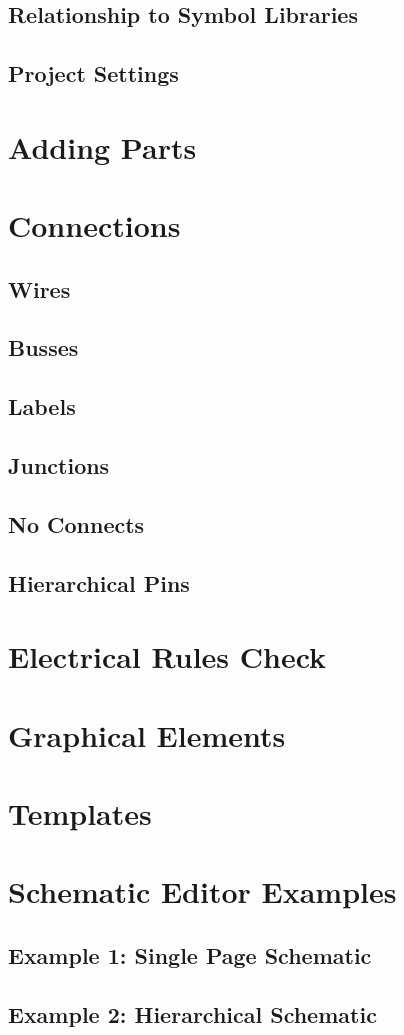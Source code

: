 \subsection{Relationship to Symbol Libraries}
\subsection{Project Settings}

\section{Adding Parts}

\section{Connections}
\subsection{Wires}
\subsection{Busses}
\subsection{Labels}
\subsection{Junctions}
\subsection{No Connects}
\subsection{Hierarchical Pins}

\section{Electrical Rules Check}

\section{Graphical Elements}

\section{Templates}

\section{Schematic Editor Examples}
\subsection{Example 1: Single Page Schematic}
\subsection{Example 2: Hierarchical Schematic}